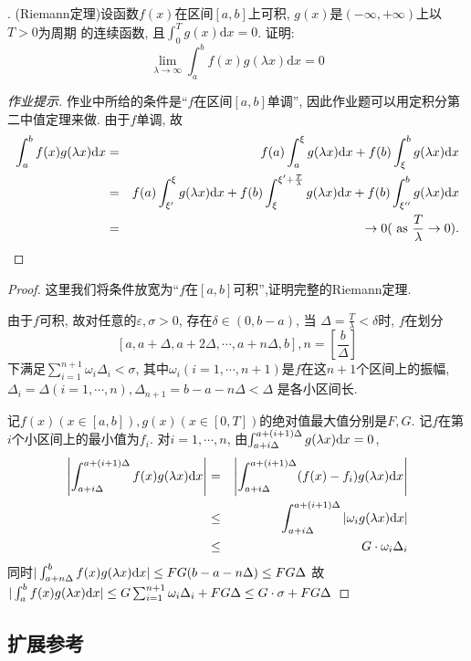 \documentclass[a4paper,12pt]{article}
\begin{document}
. (Riemann定理)设函数$f(x)$在区间$[a,b]$上可积, $g(x)$是$(-\infty,+\infty)$上以$T>0$为周期
的连续函数, 且$\int_0^Tg(x)\mathrm{d}x=0$. 证明:
\[
\lim_{\lambda\to\infty}\int_a^bf(x)g(\lambda x)\mathrm{d}x=0
\]
\begin{proof}[作业提示]
  作业中所给的条件是``$f$在区间$[a,b]$单调'', 
  因此作业题可以用定积分第二中值定理来做.
  由于$f$单调, 故
  \begin{eqnarray*}
    \int_a^bf(x)g(\lambda x)\mathrm{d} x&=&f(a)\int_a^\xi g(\lambda x)\mathrm{d} x+f(b)\int_\xi^b g(\lambda x)\mathrm{d} x\\
    &=&f(a)\int_{\xi'}^\xi g(\lambda x)\mathrm{d} x+f(b)\int_{\xi}^{\xi'+\frac{T}{\lambda}}g(\lambda x)\mathrm{d} x+f(b)\int_{\xi''}^bg(\lambda x)\mathrm{d} x\\
    &=&\to0 (\text{ as } \frac{T}{\lambda}\to0).
  \end{eqnarray*}
\end{proof}
\begin{proof}
  这里我们将条件放宽为``$f$在$[a,b]$可积'',证明完整的Riemann定理.

  由于$f$可积, 故对任意的$\varepsilon,\sigma>0$, 存在$\delta\in(0,b-a)$, 当
  $\Delta=\frac{T}{\lambda}<\delta$时, $f$在划分
  \[[a,a+\Delta,a+2\Delta,\cdots,a+n\Delta,b],n=[\frac{b}{\Delta}]\]
  下满足$\sum_{i=1}^{n+1}\omega_i\Delta_i<\sigma$, 
  其中$\omega_i(i=1,\cdots,n+1)$是$f$在这$n+1$个区间上的振幅, 
  $\Delta_i=\Delta(i=1,\cdots,n),\Delta_{n+1}=b-a-n\Delta<\Delta$
  是各小区间长.
  
  记$f(x)(x\in[a,b]),g(x)(x\in[0,T])$的绝对值最大值分别是$F,G$.
  记$f$在第$i$个小区间上的最小值为$f_i$.
  对$i=1,\cdots,n$, 由$\int_{a+i\Delta}^{a+(i+1)\Delta}g(\lambda x)\mathrm{d} x=0$, 
  \begin{eqnarray*}
    \left\vert\int_{a+i\Delta}^{a+(i+1)\Delta}f(x)g(\lambda x)\mathrm{d} x\right\vert&=&\left|\int_{a+i\Delta}^{a+(i+1)\Delta}(f(x)-f_i)g(\lambda x)\mathrm{d} x\right|\\
    &\leq&\int_{a+i\Delta}^{a+(i+1)\Delta}|\omega_ig(\lambda x)\mathrm{d} x|\\
    &\leq&G\cdot\omega_i\Delta_i
  \end{eqnarray*}
  同时$|\int_{a+n\Delta}^{b}f(x)g(\lambda x)\mathrm{d} x|\leq FG(b-a-n\Delta)\leq FG\Delta$
  故$|\int_a^bf(x)g(\lambda x)\mathrm{d} x|\leq G\sum_{i=1}^{n+1}\omega_i\Delta_i+FG\Delta\leq G\cdot\sigma+FG\Delta$
\end{proof}

\subsection*{扩展参考}
\end{document}
